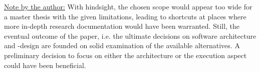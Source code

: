   \underline{Note by the author:} With hindsight, the chosen scope would appear too wide for a master thesis with the given limitations, leading to shortcuts at places where more in-depth research documentation would have been warranted. Still, the eventual outcome of the paper, i.e. the ultimate decisions on software architecture and -design are founded on solid examination of the available alternatives. A preliminary decision to focus on either the architecture or the execution aspect could have been beneficial.
